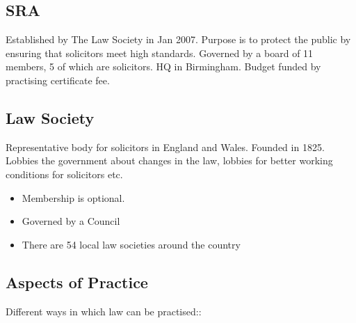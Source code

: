 \documentclass[
]{article}
\providecommand{\tightlist}{%
  \setlength{\itemsep}{0pt}\setlength{\parskip}{0pt}}
\begin{document}
\hypertarget{sra}{%
\subsection{SRA}\label{sra}}

Established by The Law Society in Jan 2007. Purpose is to protect the
public by ensuring that solicitors meet high standards. Governed by a
board of 11 members, 5 of which are solicitors. HQ in Birmingham. Budget
funded by practising certificate fee.

\hypertarget{law-society}{%
\subsection{Law Society}\label{law-society}}

Representative body for solicitors in England and Wales. Founded in
1825. Lobbies the government about changes in the law, lobbies for
better working conditions for solicitors etc.

\begin{itemize}
\tightlist
\item
  Membership is optional.
\item
  Governed by a Council
\item
  There are 54 local law societies around the country
\end{itemize}

\hypertarget{aspects-of-practice}{%
\subsection{Aspects of Practice}\label{aspects-of-practice}}

Different ways in which law can be practised::
\end{document}
